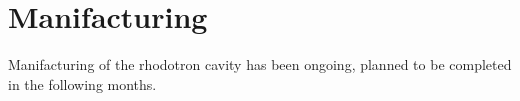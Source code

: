 \documentclass{book}
\begin{document}
\newcommand{\vecthreeBF}[1]{\vec{\textbf{#1}}}
\newcommand{\vecthree}[1]{\vec{#1}}
\newcommand{\vecNum}[3]{(#1, #2, #3)}

\newcommand{\parDeriv}[2]{\frac{\partial #1}{\partial #2}}
\newcommand{\parDerivS}[2]{\frac{\partial^2 #1}{\partial #2^2}}
\newcommand{\derivS}[2]{\frac{d^2 #1}{d#2^2}}

\newcommand{\dotProdBF}[2]{\vecthreeBF{#1} \cdot \vecthreeBF{#2}}
\newcommand{\dotProd}[2]{\vecthree{#1} \cdot \vecthree{#2}}

\newcommand{\crossProdBF}[2]{\vecthreeBF{#1} \times \vecthreeBF{#2}}
\newcommand{\crossProd}[2]{\vecthree{#1} \times \vecthree{#2}}

\newcommand{\e}{$\textbf{e}^-$ }
\newcommand{\egun}{$\textbf{e}^-$-gun }
\newcommand{\eB}{$\textbf{e}^-$ - $\vecthreeBF{B}$ }
\newcommand{\eE}{$\textbf{e}^-$ - $\vecthreeBF{E}$ }
\newcommand{\eEM}{$\textbf{e}^-$ - \textbf{EM} }
\newcommand{\ee}{$\textbf{e}^-$ - $\textbf{e}^-$ }


\newcommand{\fromeq}[1]{\textit{equation \ref{eq:#1}}}
\newcommand{\fromeqs}[2]{\textit{equations \ref{eq:#1} and \ref{eq:#2}}}
\newcommand{\fromeqsth}[3]{\textit{equations \ref{eq:#1}, \ref{eq:#2} and \ref{eq:#3}}}
\newcommand{\fromeqsf}[4]{\textit{equations \ref{eq:#1}, \ref{eq:#2}, \ref{eq:#3} and \ref{eq:#4}}}

\newcommand{\fromfig}[1]{\textit{figure \ref{fig:#1}}}
\newcommand{\fromfigs}[2]{\textit{figures \ref{fig:#1} and \ref{fig:#2}}}
\newcommand{\fromfigf}[4]{\textit{figures \ref{fig:#1}, \ref{fig:#2}, \ref{fig:#3} and \ref{fig:#4}}}

\newcommand{\fromsec}[1]{\textit{section \ref{sec:#1}}}
\newcommand{\fromsecs}[2]{\textit{sections \ref{sec:#1} and \ref{sec:#2}}}

\newcommand{\fromapp}[1]{\textit{Appendix \ref{appendix:#1}}}

\newcommand{\fromtab}[1]{\textit{Table \ref{tab:#1}}}
\newcommand{\fromtabs}[2]{\textit{Tables \ref{tab:#1} and \ref{tab:#2}}}


\newcommand{\comment}[1]{}




\section{Manifacturing}

Manifacturing of the rhodotron cavity has been ongoing, planned to be completed in the following months.
\end{document}
